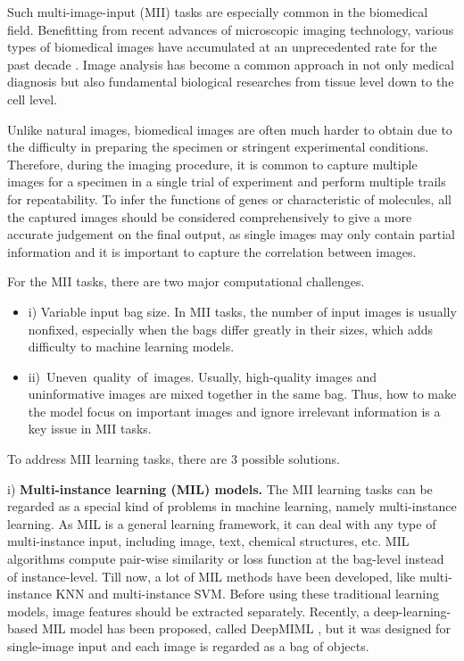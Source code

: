\documentclass[10pt,twocolumn,letterpaper]{article}
\begin{document}
Such multi-image-input (MII) tasks are especially common in the biomedical field. 
Benefitting from recent advances of microscopic imaging technology, various types of biomedical images have accumulated at an unprecedented rate for the past decade \cite{ref11,ref12,ref13,ref14}. Image analysis has become a common approach in not only medical diagnosis but also fundamental biological researches from tissue level down to the cell level. 

Unlike natural images, biomedical images are often much harder to obtain due to the difficulty in preparing the specimen or stringent experimental conditions. Therefore, during the imaging procedure, it is common to capture multiple images for a specimen in a single trial of experiment and perform multiple trails for repeatability. To infer the functions of genes or characteristic of molecules, all the captured images should be considered comprehensively to give a more accurate judgement on the final output, as single images may only contain partial information and it is important to capture the correlation between images. 

For the MII tasks, there are two major computational challenges.
\begin{itemize}
\item i) Variable input bag size. In MII tasks, the number of input images is usually nonfixed, especially when the bags differ greatly in their sizes, which adds difficulty to machine learning models.
\item ii) Uneven quality of images. Usually, high-quality images and uninformative images are mixed together in the same bag. Thus, how to make the model focus on important images and ignore irrelevant information is a key issue in MII tasks.
\end{itemize}

To address MII learning tasks, there are 3 possible solutions.


i) \textbf{Multi-instance learning (MIL) models.}
The MII learning tasks can be regarded as a special kind of problems in machine learning, namely multi-instance learning. As MIL is a general learning framework, it can deal with any type of multi-instance input, including image, text, chemical structures, etc. MIL algorithms compute pair-wise similarity or loss function at the bag-level instead of instance-level. Till now, a lot of MIL methods have been developed, like multi-instance KNN and multi-instance SVM. Before using these traditional learning models, image features should be extracted separately. Recently, a deep-learning-based MIL model has been proposed, called DeepMIML \cite{Feng2017AAAI}, but it was designed for single-image input and each image is regarded as a bag of objects. 
\end{document}
